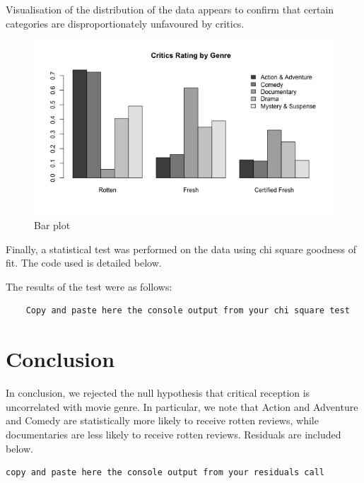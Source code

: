 \documentclass[12pt,a4paper]{article}
\begin{document}
Visualisation of the distribution of the data appears to confirm that certain categories are disproportionately unfavoured by critics.

\begin{figure}[h!]\centering
	\caption{\footnotesize Bar plot}
	\includegraphics[width=.75\textwidth]{barplot.png}
\end{figure} 

Finally, a statistical test was performed on the data using chi square goodness of fit. The code used is detailed below.



The results of the test were as follows:

\begin{verbatim}
	Copy and paste here the console output from your chi square test
\end{verbatim}

\section*{Conclusion}

In conclusion, we rejected the null hypothesis that critical reception is uncorrelated with movie genre. In particular, we note that Action and Adventure and Comedy are statistically more likely to receive rotten reviews, while documentaries are less likely to receive rotten reviews. Residuals are included below.

\begin{verbatim}
copy and paste here the console output from your residuals call
\end{verbatim}
\end{document}
